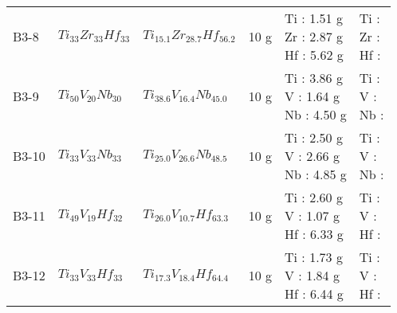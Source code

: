\begin{tabular}{llllll}
         B3-8 &                                $Ti_{33}Zr_{33}Hf_{33}$ &                          $Ti_{15.1}Zr_{28.7}Hf_{56.2}$ &                                  10 g &                                            \makecell[l]{ Ti : 1.51 g \\ Zr : 2.87 g \\ Hf : 5.62 g \\} &                    \makecell[l]{ Ti :\\ Zr :\\ Hf :\\} \\
         B3-9 &                                 $Ti_{50}V_{20}Nb_{30}$ &                           $Ti_{38.6}V_{16.4}Nb_{45.0}$ &                                  10 g &                                             \makecell[l]{ Ti : 3.86 g \\ V : 1.64 g \\ Nb : 4.50 g \\} &                     \makecell[l]{ Ti :\\ V :\\ Nb :\\} \\
        B3-10 &                                 $Ti_{33}V_{33}Nb_{33}$ &                           $Ti_{25.0}V_{26.6}Nb_{48.5}$ &                                  10 g &                                             \makecell[l]{ Ti : 2.50 g \\ V : 2.66 g \\ Nb : 4.85 g \\} &                     \makecell[l]{ Ti :\\ V :\\ Nb :\\} \\
        B3-11 &                                 $Ti_{49}V_{19}Hf_{32}$ &                           $Ti_{26.0}V_{10.7}Hf_{63.3}$ &                                  10 g &                                             \makecell[l]{ Ti : 2.60 g \\ V : 1.07 g \\ Hf : 6.33 g \\} &                     \makecell[l]{ Ti :\\ V :\\ Hf :\\} \\
        B3-12 &                                 $Ti_{33}V_{33}Hf_{33}$ &                           $Ti_{17.3}V_{18.4}Hf_{64.4}$ &                                  10 g &                                             \makecell[l]{ Ti : 1.73 g \\ V : 1.84 g \\ Hf : 6.44 g \\} &                     \makecell[l]{ Ti :\\ V :\\ Hf :\\} \\
\bottomrule
\end{tabular}
